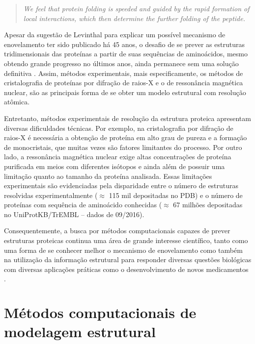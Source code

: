 \begin{quote}
\textit{We feel that protein folding is speeded and guided by the rapid formation of local interactions, which then determine the further folding of the peptide.}
\end{quote}

Apesar da sugestão de Levinthal para explicar um possível mecanismo de enovelamento ter sido publicado há 45 anos, o desafio de se prever as estruturas tridimensionais das proteínas a partir de suas sequências de aminoácidos, mesmo obtendo grande progresso no últimos anos, ainda permanece sem uma solução definitiva \cite{Moult:2009}. Assim, métodos experimentais, mais especificamente, os métodos de cristalografia de proteínas por difração de raios-X e o de ressonância magnética nuclear, são as principais forma de se obter um modelo estrutural com resolução atômica. 

Entretanto, métodos experimentais de resolução da estrutura proteica apresentam diversas dificuldades técnicas. Por exemplo, na cristalografia por difração de raios-X é necessária a obtenção de proteína em alto grau de pureza e a formação de monocristais, que muitas vezes são fatores limitantes do processo. Por outro lado, a ressonância magnética nuclear exige altas concentrações de proteína purificada em meios com diferentes isótopos e ainda além de possuir uma limitação quanto ao tamanho da proteína analisada. Essas limitações experimentais são evidenciadas pela disparidade entre o número de estruturas resolvidas experimentalmente ($\approx$ 115 mil depositadas no PDB) e o número de proteínas com sequência de aminoácido conhecidas ($\approx$ 67 milhões depositadas no UniProtKB/TrEMBL – dados de 09/2016). 

Consequentemente, a busca por métodos computacionais capazes de prever estruturas proteicas continua uma área de grande interesse científico, tanto como uma forma de se conhecer melhor o mecanismo de enovelamento como também na utilização da informação estrutural para responder diversas questões biológicas com diversas aplicações práticas como o desenvolvimento de novos medicamentos \cite{Baker:1996}.

\section{Métodos computacionais de modelagem estrutural}

